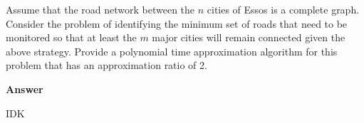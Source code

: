 \documentclass{article}
\begin{document}
\begin{itemize}
 \noindent Assume that the road network between the $n$ cities of
 Essos is a complete graph. Consider the problem of identifying the
 minimum set of roads that need to be monitored so that at least the
 $m$ major cities will remain connected given the above strategy.
 Provide a polynomial time approximation algorithm for this problem
 that has an approximation ratio of 2.

\textbf{ Answer }
\vspace{0.1in}
\begin{adjustwidth}{1.8em}{0pt}
IDK
\end{adjustwidth}
\vspace{0.1in}

\end{itemize}
\end{document}
